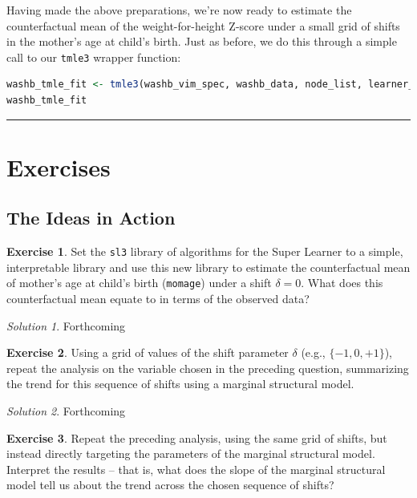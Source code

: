 \documentclass[
  12pt, krantz2,
]{krantz}
\newcommand{\passthrough}[1]{#1}
\newcommand{\1}{\mathbbm{1}}
\theoremstyle{definition}
\theoremstyle{definition}
\theoremstyle{definition}
\newtheorem{exercise}{Exercise}[chapter]
\theoremstyle{definition}
\theoremstyle{remark}
\newtheorem*{solution}{Solution}
\begin{document}
Having made the above preparations, we're now ready to estimate the
counterfactual mean of the weight-for-height Z-score under a small grid of
shifts in the mother's age at child's birth. Just as before, we do this through
a simple call to our \passthrough{\lstinline!tmle3!} wrapper function:

\begin{lstlisting}[language=R]
washb_tmle_fit <- tmle3(washb_vim_spec, washb_data, node_list, learner_list)
washb_tmle_fit
\end{lstlisting}

\begin{center}\rule{0.5\linewidth}{0.5pt}\end{center}

\hypertarget{exercises-3}{%
\section{Exercises}\label{exercises-3}}

\hypertarget{the-ideas-in-action-1}{%
\subsection{The Ideas in Action}\label{the-ideas-in-action-1}}

\begin{exercise}
Set the \passthrough{\lstinline!sl3!} library of algorithms for the Super Learner to a simple,
interpretable library and use this new library to estimate the counterfactual
mean of mother's age at child's birth (\passthrough{\lstinline!momage!}) under a shift \(\delta = 0\).
What does this counterfactual mean equate to in terms of the observed data?
\end{exercise}

\begin{solution}
Forthcoming
\end{solution}

\begin{exercise}
Using a grid of values of the shift parameter \(\delta\) (e.g., \(\{-1, 0, +1\}\)),
repeat the analysis on the variable chosen in the preceding question,
summarizing the trend for this sequence of shifts using a marginal structural
model.
\end{exercise}

\begin{solution}
Forthcoming
\end{solution}

\begin{exercise}
Repeat the preceding analysis, using the same grid of shifts, but instead
directly targeting the parameters of the marginal structural model. Interpret
the results -- that is, what does the slope of the marginal structural model
tell us about the trend across the chosen sequence of shifts?
\end{exercise}
\end{document}
